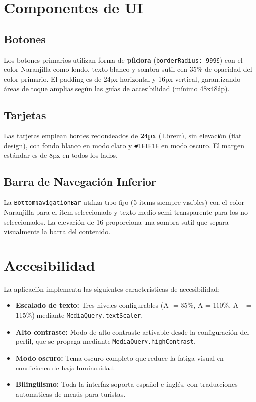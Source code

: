 \documentclass[11pt, a4paper, oneside]{report}
\begin{document}
\section{Componentes de UI}

\subsection{Botones}
Los botones primarios utilizan forma de \textbf{píldora} (\texttt{borderRadius: 9999}) con el color Naranjilla como fondo, texto blanco y sombra sutil con 35\% de opacidad del color primario. El padding es de 24px horizontal y 16px vertical, garantizando áreas de toque amplias según las guías de accesibilidad (mínimo 48x48dp).

\subsection{Tarjetas}
Las tarjetas emplean bordes redondeados de \textbf{24px} (1.5rem), sin elevación (flat design), con fondo blanco en modo claro y \texttt{\#1E1E1E} en modo oscuro. El margen estándar es de 8px en todos los lados.

\subsection{Barra de Navegación Inferior}
La \texttt{BottomNavigationBar} utiliza tipo fijo (5 ítems siempre visibles) con el color Naranjilla para el ítem seleccionado y texto medio semi-transparente para los no seleccionados. La elevación de 16 proporciona una sombra sutil que separa visualmente la barra del contenido.

\section{Accesibilidad}

La aplicación implementa las siguientes características de accesibilidad:

\begin{itemize}
  \item \textbf{Escalado de texto:} Tres niveles configurables (A- = 85\%, A = 100\%, A+ = 115\%) mediante \texttt{MediaQuery.textScaler}.
  \item \textbf{Alto contraste:} Modo de alto contraste activable desde la configuración del perfil, que se propaga mediante \texttt{MediaQuery.highContrast}.
  \item \textbf{Modo oscuro:} Tema oscuro completo que reduce la fatiga visual en condiciones de baja luminosidad.
  \item \textbf{Bilingüismo:} Toda la interfaz soporta español e inglés, con traducciones automáticas de menús para turistas.
\end{itemize}
\end{document}
